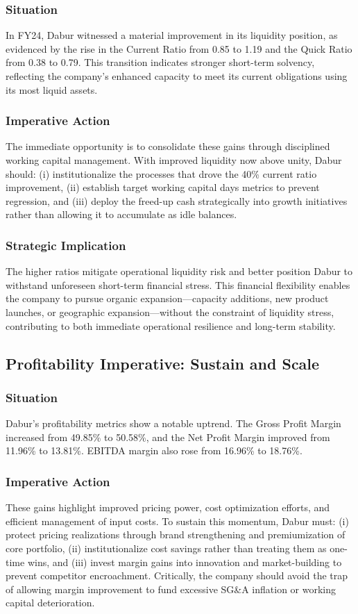 \documentclass[12pt, a4paper]{report}
\begin{document}
\subsubsection{Situation}
In FY24, Dabur witnessed a material improvement in its liquidity position, as evidenced by the rise in the Current Ratio from 0.85 to 1.19 and the Quick Ratio from 0.38 to 0.79. This transition indicates stronger short-term solvency, reflecting the company's enhanced capacity to meet its current obligations using its most liquid assets.

\subsubsection{Imperative Action}
The immediate opportunity is to consolidate these gains through disciplined working capital management. With improved liquidity now above unity, Dabur should: (i) institutionalize the processes that drove the 40\% current ratio improvement, (ii) establish target working capital days metrics to prevent regression, and (iii) deploy the freed-up cash strategically into growth initiatives rather than allowing it to accumulate as idle balances.

\subsubsection{Strategic Implication}
The higher ratios mitigate operational liquidity risk and better position Dabur to withstand unforeseen short-term financial stress. This financial flexibility enables the company to pursue organic expansion—capacity additions, new product launches, or geographic expansion—without the constraint of liquidity stress, contributing to both immediate operational resilience and long-term stability.

\subsection{Profitability Imperative: Sustain and Scale}

\subsubsection{Situation}
Dabur's profitability metrics show a notable uptrend. The Gross Profit Margin increased from 49.85\% to 50.58\%, and the Net Profit Margin improved from 11.96\% to 13.81\%. EBITDA margin also rose from 16.96\% to 18.76\%.

\subsubsection{Imperative Action}
These gains highlight improved pricing power, cost optimization efforts, and efficient management of input costs. To sustain this momentum, Dabur must: (i) protect pricing realizations through brand strengthening and premiumization of core portfolio, (ii) institutionalize cost savings rather than treating them as one-time wins, and (iii) invest margin gains into innovation and market-building to prevent competitor encroachment. Critically, the company should avoid the trap of allowing margin improvement to fund excessive SG\&A inflation or working capital deterioration.
\end{document}
